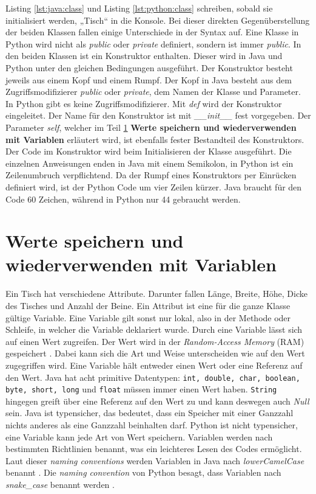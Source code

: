 Listing \ref{lst:java:class} und Listing \ref{lst:python:class} schreiben, sobald sie initialisiert werden, „Tisch“ in die Konsole. Bei dieser direkten Gegenüberstellung der beiden Klassen fallen einige Unterschiede in der Syntax auf. Eine Klasse in Python wird nicht als \textit{public} oder \textit{private} definiert, sondern ist immer \textit{public}. In den beiden Klassen ist ein Konstruktor enthalten. Dieser wird in Java und Python unter den gleichen Bedingungen ausgeführt. Der Konstruktor besteht jeweils aus einem Kopf und einem Rumpf. Der Kopf in Java besteht aus dem Zugriffsmodifizierer \textit{public} oder \textit{private}, dem Namen der Klasse und Parameter. In Python gibt es keine Zugriffsmodifizierer. Mit \textit{def} wird der Konstruktor eingeleitet. Der Name für den Konstruktor ist mit \textit{\_\_init\_\_} fest vorgegeben. Der Parameter \textit{self}, welcher im Teil \ref{wsuwmv} \textbf{Werte speichern und wiederverwenden mit Variablen} erläutert wird, ist ebenfalls fester Bestandteil des Konstruktors. Der Code im Konstruktor wird beim Initialisieren der Klasse ausgeführt. Die einzelnen Anweisungen enden in Java mit einem Semikolon, in Python ist ein Zeilenumbruch verpflichtend. Da der Rumpf eines Konstruktors per Einrücken definiert wird, ist der Python Code um vier Zeilen kürzer. Java braucht für den Code 60 Zeichen, während in Python nur 44 gebraucht werden. 
\par

\section{Werte speichern und wiederverwenden mit Variablen}\label{wsuwmv}
Ein Tisch hat verschiedene Attribute. Darunter fallen Länge, Breite, Höhe, Dicke des Tisches und Anzahl der Beine. Ein Attribut ist eine für die ganze Klasse gültige Variable. Eine Variable gilt sonst nur lokal, also in der Methode oder Schleife, in welcher die Variable deklariert wurde. Durch eine Variable lässt sich auf einen Wert zugreifen. Der Wert wird in der \textit{Random-Access Memory} (RAM) gespeichert \cite{Louis:2010}. Dabei kann sich die Art und Weise unterscheiden wie auf den Wert zugegriffen wird. Eine Variable hält entweder einen Wert oder eine Referenz auf den Wert. Java hat acht primitive Datentypen: \texttt{int, double, char, boolean, byte, short, long} und \texttt{float} müssen immer einen Wert haben. \texttt{String} hingegen greift über eine Referenz auf den Wert zu und kann deswegen auch \textit{Null} sein. Java ist typensicher, das bedeutet, dass ein Speicher mit einer Ganzzahl nichts anderes als eine Ganzzahl beinhalten darf. Python ist nicht typensicher, eine Variable kann jede Art von Wert speichern. Variablen werden nach bestimmten Richtlinien benannt, was ein leichteres Lesen des Codes ermöglicht. Laut dieser \textit{naming conventions} werden Variablen in Java nach \textit{lowerCamelCase} benannt \cite{Microsoft:CapCon}. Die \textit{naming convention} von Python besagt, dass Variablen nach \textit{snake\_case} benannt werden \cite{Ims:h-s}. \cite{JavaNC}\cite{PythonStyle}\cite{JVMS}

